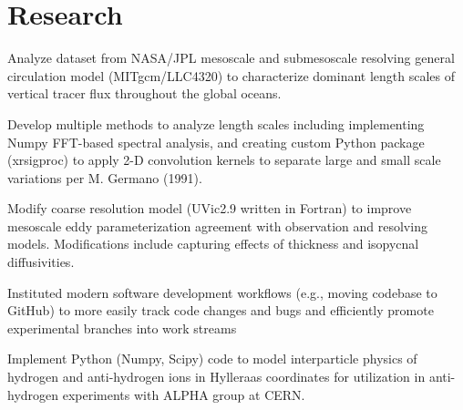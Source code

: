 \documentclass[]{deedy-resume-openfont}
\begin{document}
\begin{minipage}[t]{0.66\textwidth}

\section{Research}
\vspace{\topsep} 
\begin{tightemize}
    \item Analyze dataset from NASA/JPL mesoscale and submesoscale resolving general circulation model (MITgcm/LLC4320) to characterize dominant length scales of vertical tracer flux throughout the global oceans.
    \item Develop multiple methods to analyze length scales including implementing Numpy FFT-based spectral analysis, and creating custom Python package (xrsigproc) to apply 2-D convolution kernels to separate large and small scale variations per M. Germano (1991).
\end{tightemize}
\sectionsep

\begin{tightemize}
    \item Modify coarse resolution model (UVic2.9 written in Fortran) to improve mesoscale eddy parameterization agreement with observation and resolving models. Modifications include capturing effects of thickness and isopycnal diffusivities. 
    \item Instituted modern software development workflows (e.g., moving codebase to GitHub) to more 
    easily track code changes and bugs and efficiently promote experimental branches into work streams
\end{tightemize}
\sectionsep

\begin{tightemize}
    \item Implement Python (Numpy, Scipy) code to model interparticle physics of hydrogen and anti-hydrogen ions in Hylleraas coordinates for utilization in anti-hydrogen experiments with ALPHA group at CERN.
\end{tightemize}
\sectionsep



\end{minipage}
\end{document}
